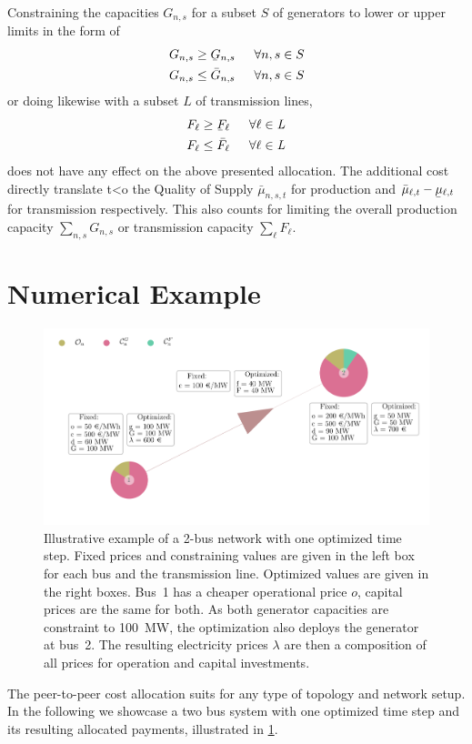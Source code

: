 \documentclass[11pt,twocolumn]{article}
\newcommand{\ubar}[1]{\underaccent{\bar}{#1}}
\newcommand{\hpad}{\hspace{15pt}}
\newcommand{\capacityGeneration}{G_{n,s}}
\newcommand{\capacityGenerationUpper}{\bar{G}_{n,s}}
\newcommand{\capacityGenerationLower}{\ubar{G}_{n,s}}
\newcommand{\capacityFlow}{F_{\ell}}
\newcommand{\capacityFlowUpper}{\bar{F}_{\ell}}
\newcommand{\capacityFlowLower}{\ubar{F}_{\ell}}
\newcommand{\muuppergeneration}[1][n]{\bar{\mu}_{#1,s,t}}
\newcommand{\mulowerflow}{\ubar{\mu}_{\ell,t}}
\newcommand{\muupperflow}{\bar{\mu}_{\ell,t}}
\begin{document}
Constraining the capacities $\capacityGeneration$  for a subset $S$ of generators to lower or upper limits in the form of 
\begin{align}
 \capacityGeneration \ge \capacityGenerationLower \hpad \forall{n,s \in S} \\
 \capacityGeneration \le \capacityGenerationUpper \hpad \forall{n,s \in S}
\end{align}
or doing likewise with a subset $L$ of transmission lines,
\begin{align}
 \capacityFlow \ge \capacityFlowLower \hpad \forall{\ell \in \textit{L}} \\
 \capacityFlow \le \capacityFlowUpper \hpad \forall{\ell \in \textit{L}}
\end{align}
does not have any effect on the above presented allocation. The additional cost directly translate t<o the Quality of Supply $\muuppergeneration$ for production and $\muupperflow - \mulowerflow$ for transmission respectively. This also counts for limiting the overall production capacity $\sum_{n,s}\capacityGeneration$ or transmission capacity $\sum_\ell \capacityFlow$. 

\section{Numerical Example}
\begin{figure}[t]
\centering
 \includegraphics[width=\linewidth]{example_network.png}
 \caption{Illustrative example of a 2-bus network with one optimized time step. Fixed prices and constraining values are given in the left box for each bus and the transmission line. Optimized values are given in the right boxes. Bus~1 has a cheaper operational price $o$, capital prices are the same for both. As both generator capacities are constraint to 100~MW, the optimization also deploys the generator at bus~2. The resulting electricity prices $\lambda$ are then a composition of all prices for operation and capital investments. }
 \label{fig:example_network}
\end{figure}
The peer-to-peer cost allocation suits for any type of topology and network setup. In the following we showcase a two bus system with one optimized time step and its resulting allocated payments, illustrated in \cref{fig:example_network}. \\
\end{document}
